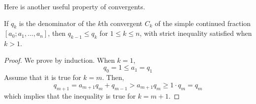 \documentclass{article}
\begin{document}
Here is another useful property of convergents.

\begin{lemma}
  \label{thm:denominator-convergent-simple-continued-fraction}
If $q_k$ is the denominator of the $k$th convergent $C_k$ of the simple continued fraction $[a_0; a_1, ..., a_n]$, then $q_{k-1} \leq q_k$ for $1 \leq k \leq n$, with strict inequality satisfied when $k >1$. 
\end{lemma}
\begin{proof}
We prove by induction. When $k=1$, 
\begin{equation}
  q_0 = 1 \leq a_1 = q_1
\end{equation}
Assume that it is true for $k=m$. Then, 
\begin{equation}
  q_{m+1} = a_{m+1} q_m + q_{m-1} > a_{m+1} q_m \geq 1 \cdot q_m = q_m
\end{equation}
which implies that the inequality is true for $k = m+1$. 
\end{proof}
\end{document}
